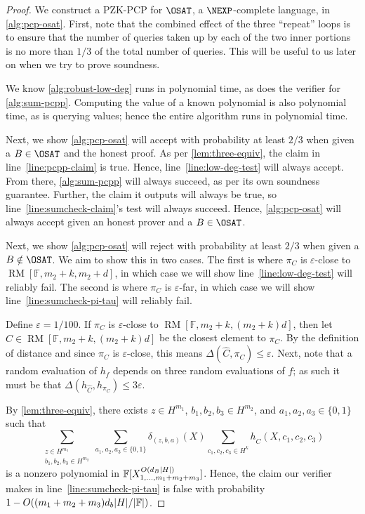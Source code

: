 \documentclass[english,12pt]{reedthesis}
\theoremstyle{plain}
\theoremstyle{definition}
\theoremstyle{remark}
\DeclareMathOperator{\RM}{RM}
\DeclarePairedDelimiter{\abs}{\lvert}{\rvert}
\begin{document}
\begin{proof}
  We construct a PZK-PCP for $\OSAT$, a $\NEXP$-complete language, in
  \cref{alg:pcp-osat}. First, note that the combined effect of the three
  ``repeat'' loops is to ensure that the number of queries taken up by each of
  the two inner portions is no more than $1/3$ of the total number of queries.
  This will be useful to us later on when we try to prove soundness.

  We know \cref{alg:robust-low-deg} runs in polynomial time, as does the
  verifier for \cref{alg:sum-pcpp}. Computing the value of a known polynomial is
  also polynomial time, as is querying values; hence the entire algorithm runs
  in polynomial time.

  Next, we show \cref{alg:pcp-osat} will accept with probability at least $2/3$
  when given a $B \in \OSAT$ and the honest proof. As per \cref{lem:three-equiv},
  the claim in line~\ref{line:pcpp-claim} is true. Hence,
  line~\ref{line:low-deg-test} will always accept. From there,
  \cref{alg:sum-pcpp} will always succeed, as per its own soundness
  guarantee. Further, the claim it outputs will always be true, so
  line~\ref{line:sumcheck-claim}'s test will always succeed. Hence,
  \cref{alg:pcp-osat} will always accept given an honest prover and a
  $B \in \OSAT$.

  Next, we show \cref{alg:pcp-osat} will reject with probability at least $2/3$
  when given a $B \notin \OSAT$. We aim to show this in two cases. The first is where
  $\pi_{C}$ is $\varepsilon$-close to $\RM[\mathbb{F}, m_{2}+k, m_{2}+d]$, in which case we
  will show line~\ref{line:low-deg-test} will reliably fail. The second is where
  $\pi_{C}$ is $\varepsilon$-far, in which case we will show line~\ref{line:sumcheck-pi-tau}
  will reliably fail.

  Define $\varepsilon = 1/100$. If $\pi_{C}$ is $\varepsilon$-close to
  $\RM[\mathbb{F}, m_{2}+k, (m_{2}+k)d]$, then let
  $\hat{C} \in \RM[\mathbb{F}, m_{2}+k, (m_{2}+k)d]$ be the closest element to
  $\pi_{C}$. By the definition of distance and since $\pi_{C}$ is $\varepsilon$-close, this
  means $\Delta(\hat{C}, \pi_{C}) \le \varepsilon$. Next, note that a random evaluation of $h_{f}$
  depends on three random evaluations of $f$; as such it must be that
  $\Delta(h_{\hat{C}}, h_{\pi_{C}}) \le 3\varepsilon$.

  By \cref{lem:three-equiv}, there exists $z \in H^{m_{1}}$,
  $b_{1}, b_{2}, b_{3} \in H^{m_{2}}$, and $a_{1}, a_{2}, a_{3} \in \{0, 1\}$ such
  that
  \begin{equation}
    \sum_{\substack{z \in H^{m_{1}} \\ b_{1}, b_{2}, b_{3} \in H^{m_{2}}}}\sum_{a_{1}, a_{2}, a_{3} \in \{0, 1\}}
    \delta_{(z,b,a)}(X)\sum_{c_{1}, c_{2}, c_{3} \in H^{k}}h_{\hat{C}}(X, c_{1}, c_{2}, c_{3})
  \end{equation}
  is a nonzero polynomial in
  $\mathbb{F}[X_{1, \ldots, m_{1}+m_{2}+m_{3}}^{O(d_{B}\abs{H})}]$. Hence, the claim
  our verifier makes in line~\ref{line:sumcheck-pi-tau} is false with
  probability $1 - O((m_{1}+m_{2}+m_{3})d_{b}\abs{H}/\abs{\mathbb{F}})$.


\end{proof}
\end{document}
